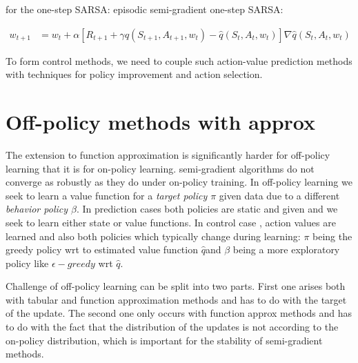 for the one-step SARSA: episodic semi-gradient one-step SARSA:

\begin{align}
    w_{t+1}&=w_t +\alpha  [R_{t+1}+\gamma \hat q(S_{t+1}, A_{t+1}, w_t)- \hat q(S_t,A_t, w_t)]\nabla \hat q(S_t,A_t, w_t)
\end{align}

To form control methods, we need to couple such action-value prediction methods with
techniques for policy improvement and action selection. 

\section{Off-policy methods with approx}

The extension to function approximation is significantly harder for off-policy
learning that it is for on-policy learning.
semi-gradient algorithms do not converge as robustly as they do under on-policy 
training.
In off-policy learning we seek to learn a value function for a \textit{target policy $\pi$}
given data due to a different \textit{behavior policy $\beta$}. In prediction cases
both policies are static and given and we seek to learn either state or value functions.
In control case , action values are learned and also both policies which typically change
during learning: $\pi$ being the greedy policy wrt to estimated value function $\hat q$and 
$\beta$ being a more exploratory policy like $\epsilon-greedy$ wrt $\hat q$.

Challenge of off-policy learning can be split into two parts.
First one arises both with tabular and function approximation methods and has to do with the target of the update.
The second one only occurs with function approx methods and has to do with the fact that the distribution
of the updates is not according to the on-policy distribution, which is important for the stability
of semi-gradient methods.


